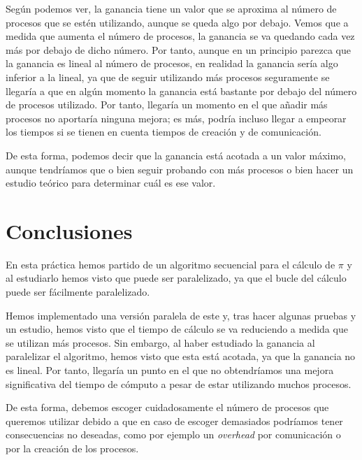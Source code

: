 \documentclass[11pt,a4paper]{article}
\begin{document}
Según podemos ver, la ganancia tiene un valor que se aproxima al número de procesos que
se estén utilizando, aunque se queda algo por debajo. Vemos que a medida que aumenta el
número de procesos, la ganancia se va quedando cada vez más por debajo de dicho número.
Por tanto, aunque en un principio parezca que la ganancia es lineal al número de procesos,
en realidad la ganancia sería algo inferior a la lineal, ya que de seguir utilizando más
procesos seguramente se llegaría a que en algún momento la ganancia está bastante por debajo
del número de procesos utilizado. Por tanto, llegaría un momento en el que añadir más procesos
no aportaría ninguna mejora; es más, podría incluso llegar a empeorar los tiempos si se tienen en
cuenta tiempos de creación y de comunicación.

De esta forma, podemos decir que la ganancia está acotada a un valor máximo, aunque tendríamos que
o bien seguir probando con más procesos o bien hacer un estudio teórico para determinar cuál es
ese valor.

\section{Conclusiones}

En esta práctica hemos partido de un algoritmo secuencial para el cálculo de $\pi$ y al estudiarlo
hemos visto que puede ser paralelizado, ya que el bucle del cálculo puede ser fácilmente
paralelizado.

Hemos implementado una versión paralela de este y, tras hacer algunas pruebas y un estudio, hemos
visto que el tiempo de cálculo se va reduciendo a medida que se utilizan más procesos. Sin
embargo, al haber estudiado la ganancia al paralelizar el algoritmo, hemos visto que esta está
acotada, ya que la ganancia no es lineal. Por tanto, llegaría un punto en el que no obtendríamos
una mejora significativa del tiempo de cómputo a pesar de estar utilizando muchos procesos.

De esta forma, debemos escoger cuidadosamente el número de procesos que queremos utilizar debido a
que en caso de escoger demasiados podríamos tener consecuencias no deseadas, como por ejemplo un
\textit{overhead} por comunicación o por la creación de los procesos.
\end{document}
